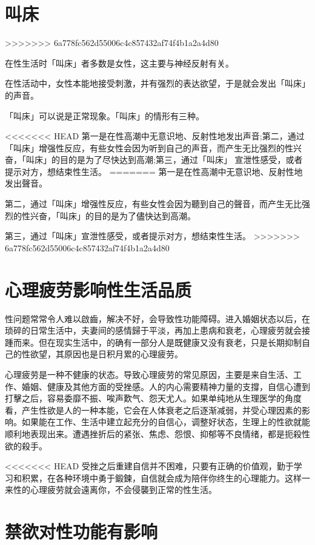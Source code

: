 \documentclass[12pt,UTF8]{ctexbook}
\begin{document}
\section{叫床}
>>>>>>> 6a778fc562d55006c4c857432af74f4b1a2a4d80

在性生活时「叫床」者多数是女性，这主要与神经反射有关。

在性活动中，女性本能地接受刺激，并有强烈的表达欲望，于是就会发出「叫床」的声音。

「叫床」可以说是正常现象。「叫床」的情形有三种。

<<<<<<< HEAD
第一是在性高潮中无意识地、反射性地发出声音;第二，通过「叫床」增强性反应，有些女性会因为听到自己的声音，而产生无比强烈的性兴奋，「叫床」的目的是为了尽快达到高潮;第三，通过「叫床」
宣泄性感受，或者提示对方，想结束性生活。
=======
第一是在性高潮中无意识地、反射性地发出聲音。

第二，通过「叫床」增强性反应，有些女性会因为聽到自己的聲音，而产生无比强烈的性兴奋，「叫床」的目的是为了儘快达到高潮。

第三，通过「叫床」宣泄性感受，或者提示对方，想结束性生活。
>>>>>>> 6a778fc562d55006c4c857432af74f4b1a2a4d80

\section{心理疲劳影响性生活品质}

性问题常常令人难以啟齒，解决不好，会导致性功能障碍。进入婚姻状态以后，在琐碎的日常生活中，夫妻间的感情歸于平淡，再加上患病和衰老，心理疲劳就会接踵而来。但在现实生活中，的确有一部分人是既健康又没有衰老，只是长期抑制自己的性欲望，其原因也是日积月累的心理疲劳。

心理疲劳是一种不健康的状态。导致心理疲劳的常见原因，主要是来自生活、工作、婚姻、健康及其他方面的受挫感。人的内心需要精神力量的支撐，自信心遭到打擊之后，容易委靡不振、唉声歎气、怨天尤人。如果单纯地从生理医学的角度看，产生性欲是人的一种本能，它会在人体衰老之后逐渐减弱，并受心理因素的影响。如果能在工作、生活中建立起充分的自信心，调整好状态，生理上的性欲就能顺利地表现出来。遭遇挫折后的紧张、焦虑、怨恨、抑郁等不良情绪，都是扼殺性欲的殺手。

<<<<<<< HEAD
受挫之后重建自信并不困难，只要有正确的价值观，勤于学习和积累，在各种环境中勇于鍛鍊，自信就会成为陪伴你终生的心理能力。这样一来性的心理疲劳就会遠离你，不会侵襲到正常的性生活。

\section{禁欲对性功能有影响}
\end{document}
